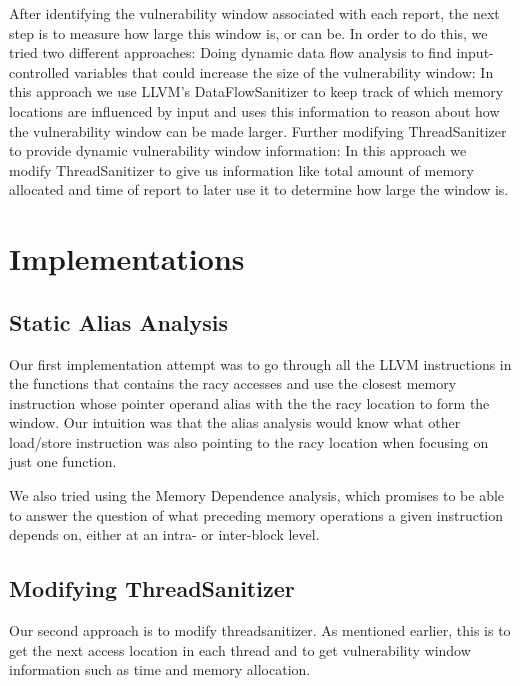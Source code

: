 \documentclass{acm_proc_article-sp}
\begin{document}
		After identifying the vulnerability window associated with each report, the next step is to measure how large this window is, or can be. In order to do this, we tried two different approaches:
		Doing dynamic data flow analysis to find input-controlled variables that could increase the size of the vulnerability window:
		In this approach we use LLVM’s DataFlowSanitizer to keep track of which memory locations are influenced by input and uses this information to reason about how the vulnerability window can be made larger.
		Further modifying ThreadSanitizer to provide dynamic vulnerability window information:
			In this approach we modify ThreadSanitizer to give us information like total amount of memory allocated and time of report to later use it to determine how large the window is.

\section{Implementations}
\subsection{Static Alias Analysis}
Our first implementation attempt was to go through all the LLVM instructions in the functions that contains the racy accesses and use the closest memory instruction whose pointer operand alias with the the racy location to form the window. Our intuition was that the alias analysis would know what other load/store instruction was also pointing to the racy location when focusing on just one function. 

We also tried using the Memory Dependence analysis, which promises to be able to answer the question of what preceding memory operations a given instruction depends on, either at an intra- or inter-block level. 

\subsection{Modifying ThreadSanitizer}
Our second approach is to modify threadsanitizer. As mentioned earlier, this is to get the next access location in each thread and to get vulnerability window information such as time and memory allocation. 
\end{document}
